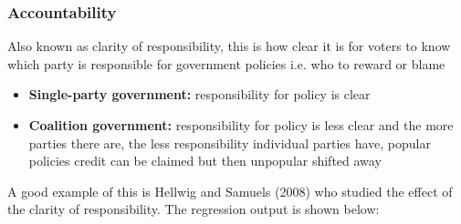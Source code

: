 \documentclass[12pt, letterpaper]{article}
\begin{document}
\subsubsection{Accountability}
Also known as clarity of responsibility, this is how clear it is for voters to know which party is responsible for government policies i.e. who to reward or blame
\begin{itemize}
	\item \textbf{Single-party government:} responsibility for policy is clear
	\item \textbf{Coalition government:} responsibility for policy is less clear and the more parties there are, the less responsibility individual parties have, popular policies credit can be claimed but then unpopular shifted away
\end{itemize}
A good example of this is Hellwig and Samuels (2008) who studied the effect of the clarity of responsibility. The regression output is shown below:
\end{document}
